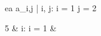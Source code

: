 \begin{eqcode}{e}{a }{}{}
  a_{i,j} | i, j: i = 1 \cap j = 2 \gets
  \begin{cases}
    5 & i: i = 1  & \otherwise \lend
  \end{cases} \lend
\end{eqcode}
